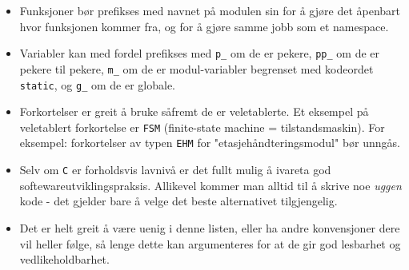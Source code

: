 \begin{itemize}
    \item Funksjoner bør prefikses med navnet på modulen sin for å gjøre det åpenbart hvor funksjonen kommer fra, og for å gjøre samme jobb som et namespace.
    \item Variabler kan med fordel prefikses med \verb|p_| om de er pekere, \verb|pp_| om de er pekere til pekere, \verb|m_| om de er modul-variabler begrenset med kodeordet \verb|static|, og \verb|g_| om de er globale.
    
    \item Forkortelser er greit å bruke såfremt de er veletablerte. Et eksempel på veletablert forkortelse er \verb|FSM| (finite-state machine = tilstandsmaskin). For eksempel: forkortelser av typen \verb|EHM| for "etasjehåndteringsmodul" bør unngås.
    
    
    
    \item Selv om \verb|C| er forholdsvis lavnivå er det fullt mulig å ivareta god softewareutviklingspraksis. Allikevel kommer man alltid til å skrive noe \textit{uggen} kode - det gjelder bare å velge det beste alternativet tilgjengelig.
    
    \item Det er helt greit å være uenig i denne listen, eller ha andre konvensjoner dere vil heller følge, så lenge dette kan argumenteres for at de gir god lesbarhet og vedlikeholdbarhet.
\end{itemize}


